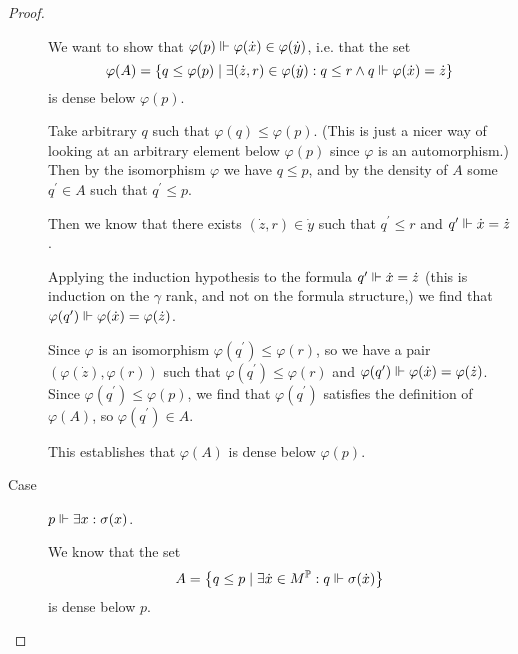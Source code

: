 \documentclass[11pt]{article}
\renewcommand{\P}{\mathbb{P}}
\renewcommand{\phi}{\varphi}
\begin{document}
\begin{proof}
\begin{description}
            We want to show that
            $\phi(p) \forces \phi(\dot x) \in \phi(\dot y)$,
            i.e. that the set
            \begin{equation*}
                \phi(A) = \setof{
                    q \leq \phi(p) \sth
                    \exists (\dot z, r) \in \phi(\dot y):
                    q \leq r \land q \forces \phi(\dot x) = \dot z
                }
            \end{equation*}
            is dense below $\phi(p)$.

            Take arbitrary $q$ such that $\phi(q) \leq \phi(p)$.
            (This is just a nicer way of looking at an arbitrary element below
            $\phi(p)$ since $\phi$ is an automorphism.)
            Then by the isomorphism $\phi$ we have $q \leq p$, and by the
            density of $A$ some $q^\prime \in A$ such that $q^\prime \leq p$.

            Then we know that there exists $(\dot z, r) \in \dot y$ such that
            $q^\prime \leq r$ and $q^\prime \Vdash \dot x = \dot z$.

            Applying the induction hypothesis to the formula
            $q^\prime \Vdash \dot x = \dot z$
            (this is induction on the $\gamma$ rank, and not on the formula
            structure,)
            we find that $\phi(q^\prime) \forces \phi(\dot x) = \phi(\dot z)$.

            Since $\phi$ is an isomorphism $\phi(q^\prime) \leq \phi(r)$,
            so we have a pair $(\phi(\dot z), \phi(r))$ such that
            $\phi(q^\prime) \leq \phi(r)$ and
            $\phi(q^\prime) \forces \phi(\dot x) = \phi(\dot z)$.
            Since $\phi(q^\prime) \leq \phi(p)$, we find that $\phi(q^\prime)$
            satisfies the definition of $\phi(A)$, so $\phi(q^\prime) \in A$.

            This establishes that $\phi(A)$ is dense below $\phi(p)$.

        \item[Case] $p \Vdash \exists x : \sigma(x)$.

            We know that the set
            \begin{equation*}
                A = \setof{
                    q \leq p \sth
                    \exists \dot x \in M^\P :
                    q \forces \sigma(\dot x)
                }
            \end{equation*}
            is dense below $p$.


\end{description}
\end{proof}
\end{document}
